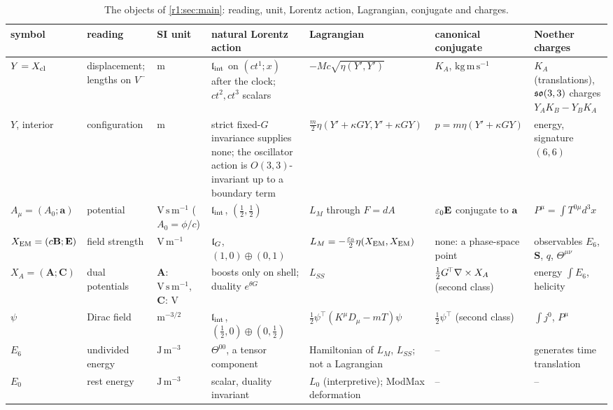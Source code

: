 \begin{table}[t]
\centering
\footnotesize
\setlength{\tabcolsep}{3pt}
\renewcommand{\arraystretch}{1.15}
\begin{tabular}{@{}>{\raggedright\arraybackslash}p{1.45cm}>{\raggedright\arraybackslash}p{1.95cm}>{\raggedright\arraybackslash}p{1.25cm}%
>{\raggedright\arraybackslash}p{2.2cm}>{\raggedright\arraybackslash}p{2.9cm}>{\raggedright\arraybackslash}p{2.35cm}>{\raggedright\arraybackslash}p{2.4cm}@{}}
\toprule
symbol & reading & SI unit & natural Lorentz action & Lagrangian & canonical conjugate & Noether charges\\
\midrule
$Y=X_{\rm cl}$ & displacement; lengths on $V^-$ & m & $\mathfrak l_{\rm int}$ on $(ct^1;x)$ after the clock; $ct^2,ct^3$ scalars & $-Mc\sqrt{\eta(Y',Y')}$ &
$K_A$, $\mathrm{kg\,m\,s^{-1}}$ & $K_A$ (translations), $\mathfrak{so}(3,3)$ charges $Y_AK_B-Y_BK_A$\\
$Y$, interior & configuration & m & strict fixed-$G$ invariance supplies none; the oscillator action is $O(3,3)$-invariant up to a boundary term & $\tfrac m2\eta(Y'+\kappa GY,Y'+\kappa GY)$ & $p=m\eta(Y'+\kappa GY)$ & energy, signature $(6,6)$\\
$A_\mu=(A_0;\mathbf a)$ & potential & $\mathrm{V\,s\,m^{-1}}$ ($A_0=\phi/c$) & $\mathfrak l_{\rm int}$, $(\tfrac12,\tfrac12)$ & $L_M$ through $F=dA$ & $\varepsilon_0\mathbf E$ conjugate to $\mathbf a$ & $P^\mu=\int T^{0\mu}d^3x$\\
$X_{\rm EM}=(c\mathbf B;\mathbf E)$ & field strength & $\mathrm{V\,m^{-1}}$ & $\mathfrak l_G$, $(1,0)\oplus(0,1)$ & $L_M=-\tfrac{\varepsilon_0}2\eta(X_{\rm EM},X_{\rm EM})$ &
none: a phase-space point & observables $E_6$, $\mathbf S$, $q$, $\Theta^{\mu\nu}$\\
$X_A=(\mathbf A;\mathbf C)$ & dual potentials & $\mathbf A$: $\mathrm{V\,s\,m^{-1}}$, $\mathbf C$: V & boosts only on shell; duality $e^{\theta G}$ & $L_{SS}$ & $\tfrac12G^{\!\top}\nabla\times X_A$ (second class) & energy $\int E_6$, helicity\\
$\psi$ & Dirac field & $\mathrm m^{-3/2}$ & $\mathfrak l_{\rm int}$, $(\tfrac12,0)\oplus(0,\tfrac12)$ & $\tfrac12\psi^{\!\top}(K^\mu D_\mu-mT)\psi$ & $\tfrac12\psi^{\!\top}$ (second class) & $\int j^0$, $P^\mu$\\
$E_6$ & undivided energy & $\mathrm{J\,m^{-3}}$ & $\Theta^{00}$, a tensor component & Hamiltonian of $L_M$, $L_{SS}$; not a Lagrangian & -- & generates time translation\\
$E_0$ & rest energy & $\mathrm{J\,m^{-3}}$ & scalar, duality invariant & $L_0$ (interpretive); ModMax deformation & -- & --\\
\bottomrule
\end{tabular}
\caption{The objects of \cref{r1:sec:main}: reading, unit, Lorentz action, Lagrangian, conjugate and charges.}
\label{r1:tab:objects}
\end{table}

